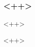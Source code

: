 \documentclass[xcolor=dvipsnames]{beamer}
\title{}
\author{Jace Babin}
\begin{document}
\maketitle

\begin{frame}
\frametitle{<++>}
<++>
\end{frame}
<++>
\end{document}
